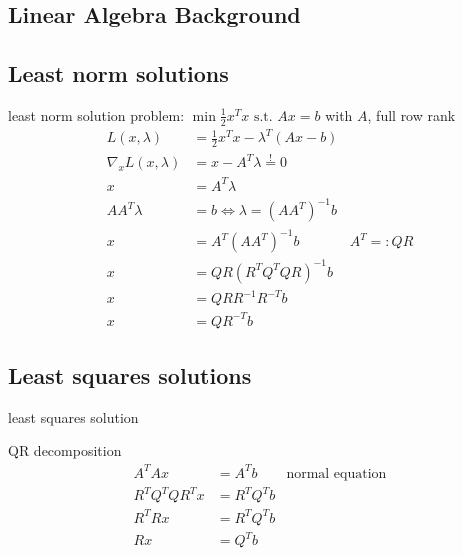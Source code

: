 \documentclass{beamer}
\begin{document}
\subsection{Linear Algebra Background}

\subsection{Least norm solutions}

\begin{frame} {least norm solution}
problem: \(\min \frac{1}{2} x^Tx \text{ s.t. } Ax = b\) with \(A\), full row rank
\pause
\begin{align*}
	L(x,\lambda) &= \frac{1}{2} x^Tx - \lambda^T (Ax -b)\\
	\nabla_x L(x,\lambda) &= x - A^T \lambda \stackrel{!}{=} 0\\
	x & = A^T \lambda\\
	AA^T \lambda &= b \Leftrightarrow \lambda = (AA^T)^{-1} b\\
	x &= A^T(AA^T)^{-1} b & A^T =: QR\\
	x &= QR(R^TQ^TQR)^{-1}b\\
	x &= QRR^{-1} R^{-T}b\\
	x &= QR^{-T}b
\end{align*}
\end{frame}

\subsection{Least squares solutions}

\begin{frame}{least squares solution}
\begin{block}{QR decomposition}
\begin{align*}
	A^TAx &= A^T b & \text{normal equation}\\
	R^TQ^TQR^Tx &= R^TQ^Tb\\
	R^TRx & = R^TQ^Tb\\
	Rx &= Q^T b\\
\end{align*}
\end{block}
\end{frame}
\end{document}
